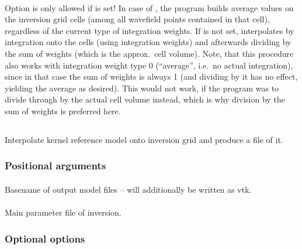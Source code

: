 \paragraph{}
Option  is only allowed if  is set! In case of ,
the program builds average values on the inversion grid cells (among all wavefield points contained in that cell),
regardless of the current type of integration weights. If  is not set,  
interpolates by integration onto the cells (using integration weights) and afterwards dividing by the sum of 
weights (which is the approx.\ cell volume). Note, that this procedure also works with integration weight type
0 (``average'', i.e.\ no actual integration), since in that case the sum of weights is always 1 (and dividing
by it has no effect, yielding the average as desired). This would not work, if the program was to divide through
by the actual cell volume instead, which is why division by the sum of weights is preferred here.
%
%
\subsection{} \label{programs_scripts,sec:bin_prog,sec:krm_kim}
Interpolate kernel reference model onto inversion grid and produce a  file of it.

\subsubsection{Positional arguments}
\paragraph{}
Basename of output model files -- will additionally be written as vtk.
\paragraph{}
Main parameter file of inversion.
\subsubsection{Optional options}
